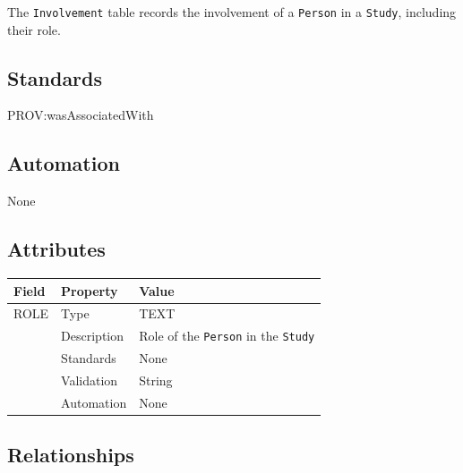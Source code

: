 \documentclass[
]{article}
\newcounter{none}
\begin{document}
The \texttt{Involvement} table records the involvement of a
\texttt{Person} in a \texttt{Study}, including their role.

\subsection{Standards}\label{standards-18}

PROV:wasAssociatedWith

\subsection{Automation}\label{automation-18}

None

\subsection{Attributes}\label{attributes-16}

{\def\LTcaptype{none} 
\begin{longtable}[]{@{}lll@{}}
\toprule\noalign{}
Field & Property & Value \\
\midrule\noalign{}
\endhead
\bottomrule\noalign{}
\endlastfoot
ROLE & Type & TEXT \\
& Description & Role of the \texttt{Person} in the \texttt{Study} \\
& Standards & None \\
& Validation & String \\
& Automation & None \\
\end{longtable}
}

\subsection{Relationships}\label{relationships-14}
\end{document}
